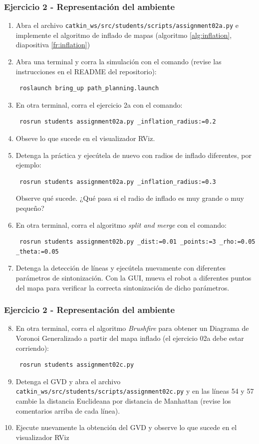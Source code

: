 \begin{frame}[containsverbatim]\frametitle{Ejercicio 2 - Representación del ambiente}
  \begin{enumerate}
  \item Abra el archivo \texttt{catkin\_ws/src/students/scripts/assignment02a.py} e implemente el algoritmo de inflado de mapas (algoritmo \ref{alg:inflation}, diapositiva \ref{fr:inflation})
  \item Abra una terminal y corra la simulación con el comando (revise las instrucciones en el README del repositorio):
\begin{verbatim}
 roslaunch bring_up path_planning.launch
\end{verbatim}
  \item En otra terminal, corra el ejercicio 2a con el comando:
\begin{verbatim}
 rosrun students assignment02a.py _inflation_radius:=0.2
\end{verbatim}
  \item Obseve lo que sucede en el visualizador RViz.
  \item Detenga la práctica y ejecútela de nuevo con radios de inflado diferentes, por ejemplo:
\begin{verbatim}
 rosrun students assignment02a.py _inflation_radius:=0.3
\end{verbatim}
Observe qué sucede. ¿Qué pasa si el radio de inflado es muy grande o muy pequeño?
  \item En otra terminal, corra el algoritmo \textit{split and merge} con el comando:
\begin{verbatim}
 rosrun students assignment02b.py _dist:=0.01 _points:=3 _rho:=0.05 _theta:=0.05
\end{verbatim}
\item Detenga la detección de líneas y ejecútela nuevamente con diferentes parámetros de sintonización. Con la GUI, mueva el robot a diferentes puntos del mapa para verificar la correcta sintonización de dicho parámetros.
  \end{enumerate}
\end{frame}

\begin{frame}[containsverbatim]\frametitle{Ejercicio 2 - Representación del ambiente}
    \begin{enumerate}
    \setcounter{enumi}{7}
  \item En otra terminal, corra el algoritmo \textit{Brushfire} para obtener un Diagrama de Voronoi Generalizado a partir del mapa inflado (el ejercicio 02a debe estar corriendo):
\begin{verbatim}
 rosrun students assignment02c.py
\end{verbatim}

  \item Detenga el GVD y abra el archivo \texttt{catkin\_ws/src/students/scripts/assignment02c.py} y en las líneas 54 y 57 cambie la distancia Euclideana por distancia de Manhattan (revise los comentarios arriba de cada línea).
  \item Ejecute nuevamente la obtención del GVD y observe lo que sucede en el visualizador RViz
  \end{enumerate}
\end{frame}



